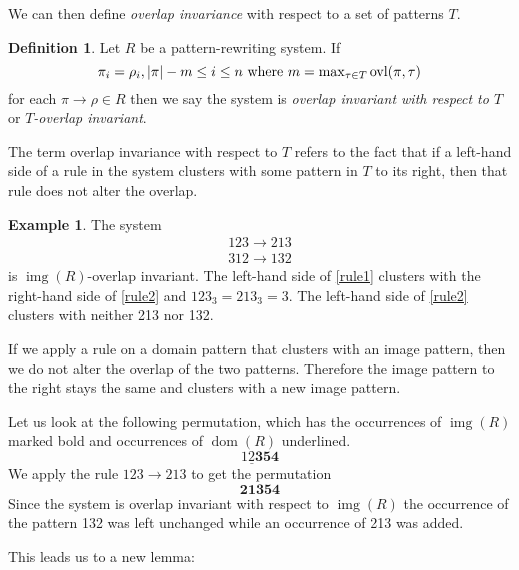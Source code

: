 \documentclass[a4paper, 11pt, english]{article}
\newcommand{\patternrule}{ \to \!}
\theoremstyle{definition}
\newtheorem{definition}[theorem]{Definition}
\newtheorem{example}[theorem]{Example}
\DeclareMathOperator{\dom}{dom}
\DeclareMathOperator{\img}{img}
\DeclareMathOperator{\ovl}{ovl}
\begin{document}
We can then define \emph{overlap invariance} with respect to a set of patterns $T$.
\begin{definition}
    Let $R$ be a pattern-rewriting system. If
    \[
        \pi_i = \rho_i, |\pi|-m \leq i \leq n \  \textnormal{where}
        \ m = \max\nolimits_{\tau \in T} \ovl(\pi, \tau)
    \]
    for each $\pi \patternrule \rho \in R$
    then we say the system is \emph{overlap invariant with respect to $T$} or \emph{$T$-overlap
    invariant}.
\end{definition}

The term overlap invariance with respect to $T$ refers to the fact that if a left-hand side of a rule in the system clusters
with some pattern in $T$ to its right, then that rule does not alter the overlap.

\begin{example}
  The system
  \begin{align*}
    123 \patternrule 213 \label{rule1} \tag{1} \\
    312 \patternrule 132 \label{rule2} \tag{2}
  \end{align*}
  is $\img(R)$-overlap invariant. The left-hand side of \eqref{rule1} clusters with the right-hand side of
  \eqref{rule2} and $123_3 = 213_3 = 3$. The left-hand side of \eqref{rule2} clusters with neither 213 nor 132.

  If we apply a rule on a domain pattern that clusters with an image pattern, then we
  do not alter the overlap of the two patterns. Therefore the image pattern to the right stays the
  same and clusters with a new image pattern.
  
  Let us look at the following permutation, which has the occurrences of $\img(R)$ marked bold and
  occurrences of $\dom(R)$ underlined.
  \[
    \underline{12\bm{3}}\bm{54}
  \]
  We apply the rule $123 \patternrule 213$ to get the permutation
  \[
    \bm{21\bm{3}}\bm{54}
  \]
  Since the system is overlap invariant with respect to $\img(R)$ the occurrence of the pattern 132 was left unchanged while
  an occurrence of 213 was added.
\end{example}

This leads us to a new lemma:
\end{document}

